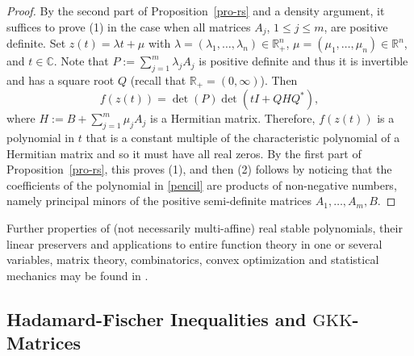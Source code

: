 \documentclass[10pt,reqno]{amsart}
\theoremstyle{plain}
\theoremstyle{definition}
\theoremstyle{remark}
\newcommand{\GKK}{\text{GKK}}
\newcommand{\RR}{\mathbb{R}}
\newcommand{\CC}{\mathbb{C}}
\begin{document}
\begin{proof}
By the second part of Proposition~\ref{pro-rs} and a density argument,  
it suffices to prove (1) 
in the case when  all matrices $A_j$, $1\le j\le m$, are 
positive definite. Set $z(t)=\lambda t+ \mu$ with
$\lambda=(\lambda_1,\ldots,\lambda_n)\in \RR_+^n$,
$\mu=(\mu_1,\ldots,\mu_n)\in \RR^n$, and $t\in \CC$. Note that 
$P:=\sum_{j=1}^m\lambda_jA_j$
is positive definite and thus it is invertible and has a square root $Q$ (recall
that $\RR_+=(0,\infty)$). 
Then 
\begin{equation*}
f(z(t))=\det(P)\det(tI+QHQ^*),
\end{equation*}
where $H:=B+\sum_{j=1}^m\mu_jA_j$ is a Hermitian matrix. 
Therefore, $f(z(t))$ is a polynomial in $t$ that is a 
constant multiple of the characteristic polynomial of a
Hermitian matrix and so it must have all real zeros. By 
the first part of Proposition~\ref{pro-rs}, this proves (1), and then (2)
follows by noticing that the coefficients of the polynomial in \eqref{pencil}
are products of non-negative numbers, namely principal minors of the 
positive semi-definite matrices $A_1,\ldots,A_m,B$.
\end{proof}

Further properties of (not necessarily multi-affine) real stable 
polynomials, their linear
preservers and applications to entire function theory in one or several 
variables, matrix theory, combinatorics, convex optimization and statistical 
mechanics may be found in \cite{BBS,BBS1,BBS2,PB,COSW,guler,LS}.

\subsection{Hadamard-Fischer Inequalities and $\GKK$-Matrices}\label{ss-gkk}
\end{document}
